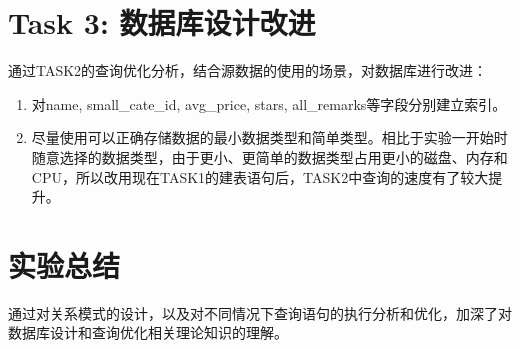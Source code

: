 \documentclass[a4paper, 11pt, nofonts, nocap, fancyhdr]{ctexart}
\begin{document}
\section{Task 3: 数据库设计改进}

通过TASK2的查询优化分析，结合源数据的使用的场景，对数据库进行改进：

\begin{enumerate}
	\item 对name, small_cate_id, avg_price, stars, all_remarks等字段分别建立索引。
	\item 尽量使用可以正确存储数据的最小数据类型和简单类型。相比于实验一开始时随意选择的数据类型，由于更小、更简单的数据类型占用更小的磁盘、内存和CPU，所以改用现在TASK1的建表语句后，TASK2中查询的速度有了较大提升。
\end{enumerate}

\section{实验总结}

通过对关系模式的设计，以及对不同情况下查询语句的执行分析和优化，加深了对数据库设计和查询优化相关理论知识的理解。
\end{document}
